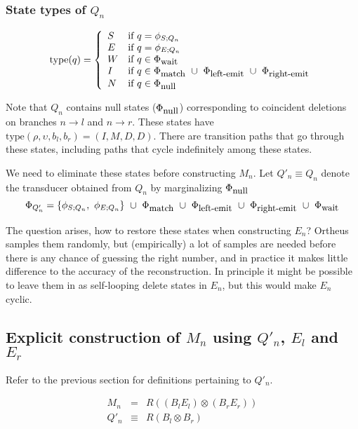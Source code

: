 \documentclass{article}
\newcommand{\seclabel}[1]{\label{sec.#1}}
\newcommand\transequiv{\equiv}
\newcommand\compose{}
\newcommand\fork{\otimes}
\newcommand\States{\Phi}
\newcommand\statesof[1]{\States_{#1}}
\newcommand\startstateof[1]{\phi_{S;#1}}
\newcommand\laststateof[1]{\phi_{E;#1}}
\newcommand\statetype{\mbox{type}}
\newcommand\stateset[1]{\statesof{\mbox{\small #1}}}
\newcommand\qstate{(\rho,\upsilon,b_l,b_r)}
\newcommand\matchsuffix{match}
\newcommand\nullsuffix{null}
\newcommand\leftemitsuffix{left-emit}
\newcommand\rightemitsuffix{right-emit}
\newcommand\qwaitsuffix{wait}
\newcommand\matchstates{\stateset{\matchsuffix}}
\newcommand\nullstates{\stateset{\nullsuffix}}
\newcommand\leftemitstates{\stateset{\leftemitsuffix}}
\newcommand\rightemitstates{\stateset{\rightemitsuffix}}
\newcommand\qwaitstates{\stateset{\qwaitsuffix}}
\begin{document}
\subsubsection{State types of $Q_n$}

\[
\statetype(q) = \left\{ \begin{array}{ll}
S & \mbox{if $q = \startstateof{Q_n}$} \\
E & \mbox{if $q = \laststateof{Q_n}$} \\
W & \mbox{if $q \in \qwaitstates$} \\
I & \mbox{if $q \in \matchstates\ \cup\ \leftemitstates\ \cup\ \rightemitstates$} \\
N & \mbox{if $q \in \nullstates$}
\end{array} \right.
\]

Note that $Q_n$ contains null states ($\nullstates$) corresponding to coincident deletions on branches $n \to l$ and $n \to r$.
These states have $\statetype\qstate=(I,M,D,D)$.
There are transition paths that go through these states, including paths that cycle indefinitely among these states.

We need to eliminate these states before constructing $M_n$.
Let $Q'_n \transequiv Q_n$ denote the transducer obtained from $Q_n$ by marginalizing $\nullstates$
\[
\statesof{Q'_n} = \{ \startstateof{Q_n},\ \laststateof{Q_n} \}\ \cup\ \matchstates\ \cup\ \leftemitstates\ \cup\ \rightemitstates\ \cup\ \qwaitstates
\]

The question arises, how to restore these states when constructing $E_n$?
Ortheus samples them randomly,
but (empirically) a lot of samples are needed before there is any chance of guessing the right number,
and in practice it makes little difference to the accuracy of the reconstruction.
In principle it might be possible to leave them in as self-looping delete states in $E_n$, but this would make $E_n$ cyclic.

\subsection{Explicit construction of $M_n$ using $Q'_n$, $E_l$ and $E_r$}
\seclabel{Mn}
Refer to the previous section for definitions pertaining to $Q'_n$.

\begin{eqnarray*}
M_n & = & R \compose ((B_l \compose E_l) \fork (B_r \compose E_r)) \\
Q'_n & \transequiv & R \compose (B_l \fork B_r)
\end{eqnarray*}
\end{document}
